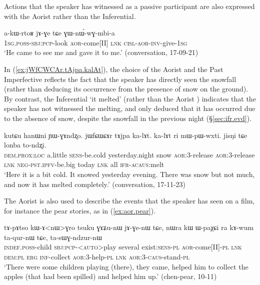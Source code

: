 Actions that the speaker has witnessed as a passive participant are also expressed with the Aorist rather than the Inferential.

\begin{exe}
\ex \label{ex:jAGE.GWnWwGmbia}
 \gll a-kɯ-rtoʁ jɤ-ɣe tɕe ɣɯ-nɯ́-wɣ-mbi-a \\
 \textsc{1sg}.\textsc{poss}-\textsc{sbj}:\textsc{pcp}-look \textsc{aor}-come[II] \textsc{lnk} \textsc{cisl}-\textsc{aor}-\textsc{inv}-give-\textsc{1sg} \\
 \glt `He came to see me and gave it to me.' (conversation, 17-09-21)
\end{exe}

In (\ref{ex:jWfCWCAr.tAjpa.kalAt}), the choice of the Aorist  and the Past Imperfective  reflects the fact that the speaker has directly seen the snowfall (rather than deducing its occurrence from the presence of snow on the ground). By contrast, the Inferential  `it melted' (rather than the Aorist ) indicates that the speaker has not witnessed the melting, and only deduced that it has occurred due to the absence of snow, despite the snowfall in the previous night (§\ref{sec:ifr.evd}).

\begin{exe}
\ex \label{ex:jWfCWCAr.tAjpa.kalAt}
 \gll kutɕu hanɯni ɲɯ-ɣɤndʐo. jɯfɕɯɕɤr tɤjpa ka-lɤt. ka-lɤt ri mɯ-pɯ-wxti. jisŋi tɕe lonba to-ndʐi. \\
 \textsc{dem}.\textsc{prox}:\textsc{loc} a.little \textsc{sens}-be.cold yesterday.night snow \textsc{aor}:3\flobv{}-release \textsc{aor}:3\flobv{}-release  \textsc{lnk} \textsc{neg}-\textsc{pst}.\textsc{ipfv}-be.big today \textsc{lnk} all \textsc{ifr}-\textsc{acaus}:melt \\
\glt `Here it is a bit cold. It snowed yesterday evening. There was snow but not much, and now it has melted completely.' (conversation, 17-11-23)
\end{exe}

The Aorist is also used to describe the events that the speaker has seen on a film, for instance the pear stories, as in (\ref{ex:aor.pear}). 

\begin{exe}
\ex \label{ex:aor.pear}
 \gll tɤ-pɤtso kɯ-ɤ<nɯ>ɣro tsuku ɣɤʑu-nɯ jɤ-ɣe-nɯ tɕe, nɯra kɯ ɯ-paχɕi ra kɤ-wum ta-qur-nɯ tɕe, ta-sɯɣ-ndzur-nɯ \\
 \textsc{indef}.\textsc{poss}-child \textsc{sbj}:\textsc{pcp}-<\textsc{auto}>play several exist:\textsc{sens}-\textsc{pl} \textsc{aor}-come[II]-\textsc{pl} \textsc{lnk} \textsc{dem}:\textsc{pl} \textsc{erg} \textsc{inf}-collect \textsc{aor}:3\flobv{}-help-\textsc{pl} \textsc{lnk} \textsc{aor}:3\flobv{}-\textsc{caus}-stand-\textsc{pl} \\
 \glt `There were some children playing (there), they came, helped him to collect the apples (that had been spilled) and helped him up.' (chen-pear, 10-11)
\end{exe}

